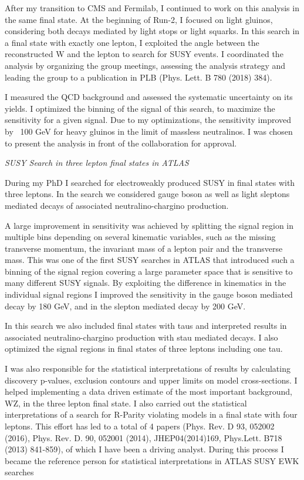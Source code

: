 \documentclass[]{cv} %
\begin{document}
\begin{statement}
After my transition to CMS and Fermilab, I continued to work on this analysis in
the same final state. At the beginning of Run-2, I focused on light gluinos,
considering both decays mediated by light stops or light squarks. In this search
in a final state with exactly one lepton, I exploited the angle between the
reconstructed W and the lepton to search for SUSY events. I coordinated the
analysis by organizing the group meetings, assessing the analysis strategy and
leading the group to a publication in PLB (Phys. Lett. B 780 (2018) 384).

I measured the QCD background and assessed the systematic uncertainty on its
yields. I optimized the binning of the signal of this search, to maximize the
sensitivity for a given signal. Due to my optimizations, the sensitivity
improved by ~100 GeV for heavy gluinos in the limit of massless neutralinos. I
was chosen to present the analysis in front of the collaboration for approval.

\vspace{15pt}
\Large{}
\textit{SUSY Search in three lepton final states in ATLAS}
\normalsize{}

During my PhD I searched for electroweakly produced SUSY in final states with
three leptons. In the search we considered gauge boson as well as light sleptons
mediated decays of associated neutralino-chargino production.

A large improvement in sensitivity was achieved by splitting the signal region
in multiple bins depending on several kinematic variables, such as the missing
transverse momentum, the invariant mass of a lepton pair and the transverse
mass. This was one of the first SUSY searches in ATLAS that introduced such a
binning of the signal region covering a large parameter space that is sensitive
to many different SUSY signals. By exploiting the difference in kinematics in
the individual signal regions I improved the sensitivity in the gauge boson
mediated decay by 180 GeV, and in the slepton mediated decay by 200 GeV.

In this search we also included final states with taus and interpreted results
in associated neutralino-chargino production with stau mediated decays. I also
optimized the signal regions in final states of three leptons including one tau.

I was also responsible for the statistical interpretations of results by
calculating discovery p-values, exclusion contours and upper limits on model
cross-sections. I helped implementing a data driven estimate of the most
important background, WZ, in the three lepton final state. I also carried out
the statistical interpretations of a search for R-Parity violating models in a
final state with four leptons. This effort has led to a total of 4 papers (Phys.
Rev. D 93, 052002 (2016), Phys. Rev. D. 90, 052001 (2014), JHEP04(2014)169,
Phys.Lett. B718 (2013) 841-859), of which I have been a driving analyst. During
this process I became the reference person for statistical interpretations in
ATLAS SUSY EWK searches


\end{statement}
\end{document}
